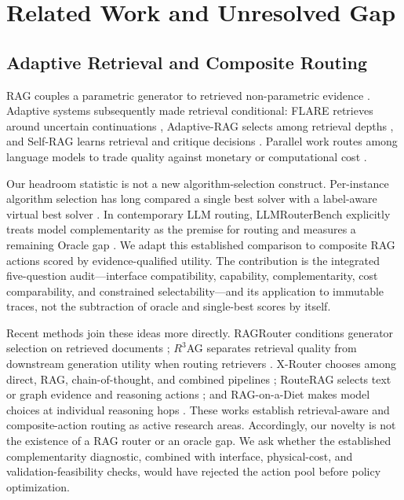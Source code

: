 \section{Related Work and Unresolved Gap}
\label{sec:related}

\subsection{Adaptive Retrieval and Composite Routing}

RAG couples a parametric generator to retrieved non-parametric evidence
\cite{Lewis2020RAG}. Adaptive systems subsequently made retrieval conditional:
FLARE retrieves around uncertain continuations \cite{JiangEtAl2023FLARE},
Adaptive-RAG selects among retrieval depths \cite{JeongEtAl2024AdaptiveRAG}, and
Self-RAG learns retrieval and critique decisions \cite{AsaiEtAl2024SelfRAG}.
Parallel work routes among language models to trade quality against monetary or
computational cost \cite{ChenZahariaZou2024FrugalGPT,DingEtAl2024HybridLLM,
OngEtAl2024RouteLLM}.

Our headroom statistic is not a new algorithm-selection construct. Per-instance
algorithm selection has long compared a single best solver with a label-aware
virtual best solver \cite{Rice1976AlgorithmSelection,
LindauerEtAl2019AlgorithmSelection}. In contemporary LLM routing,
LLMRouterBench explicitly treats model complementarity as the premise for routing
and measures a remaining Oracle gap \cite{LiEtAl2026LLMRouterBench}. We adapt this
established comparison to composite RAG actions scored by evidence-qualified
utility. The contribution is the integrated five-question audit---interface
compatibility, capability, complementarity, cost comparability, and constrained
selectability---and its application to immutable traces, not the subtraction of
oracle and single-best scores by itself.

Recent methods join these ideas more directly. RAGRouter conditions generator
selection on retrieved documents \cite{ZhangEtAl2025RAGRouter}; $R^3$AG separates
retrieval quality from downstream generation utility when routing retrievers
\cite{ZhaoEtAl2026R3AG}. X-Router chooses among direct, RAG, chain-of-thought, and
combined pipelines \cite{WangEtAl2026XRouter}; RouteRAG selects text or graph
evidence and reasoning actions \cite{GuoEtAl2026RouteRAG}; and RAG-on-a-Diet makes
model choices at individual reasoning hops \cite{DingZhao2026RAGDiet}. These works
establish retrieval-aware and composite-action routing as active research areas.
Accordingly, our novelty is not the existence of a RAG router or an oracle gap. We
ask whether the established complementarity diagnostic, combined with interface,
physical-cost, and validation-feasibility checks, would have rejected the action
pool before policy optimization.

